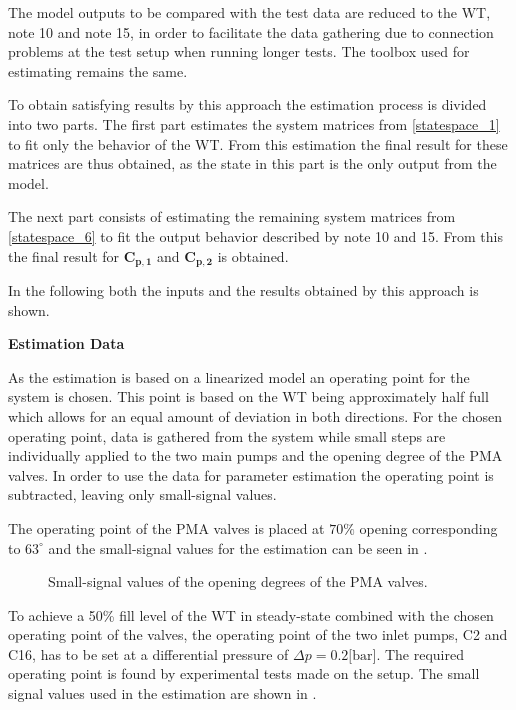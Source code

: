 The model outputs to be compared with the test data are reduced to the WT, note 10 and note 15, in order to facilitate the data gathering due to connection problems at the test setup when running longer tests. The toolbox used for estimating remains the same. 

To obtain satisfying results by this approach the estimation process is divided into two parts. 
The first part estimates the system matrices from \eqref{statespace_1} to fit only the behavior of the WT. From this estimation the final result for these matrices are thus obtained, as the state in this part is the only output from the model.

The next part consists of estimating the remaining system matrices from \eqref{statespace_6} to fit the output behavior described by note 10 and 15. From this the final result for $ \bm{C_{p,1}} $ and $ \bm{C_{p,2}}$ is obtained. 

In the following both the inputs and the results obtained by this approach is shown.

\textbf{Estimation Data}

As the estimation is based on a linearized model an operating point for the system is chosen. This point is based on the WT being approximately half full which allows for an equal amount of deviation in both directions. For the chosen operating point, data is gathered from the system while small steps are individually applied to the two main pumps and the opening degree of the PMA valves. In order to use the data for parameter estimation the operating point is subtracted, leaving only small-signal values.  

The operating point of the PMA valves is placed at $70\%$ opening corresponding to $63^{\circ}$ and the small-signal values for the estimation can be seen in .

\begin{figure}[H]
\centering
 
\caption{Small-signal values of the opening degrees of the PMA valves.}
\label{fig:est_OD_data_final}
\end{figure}

To achieve a 50\% fill level of the WT in steady-state combined with the chosen operating point of the valves, the operating point of the two inlet pumps, C2 and C16, has to be set at a differential pressure of $\Delta p = 0.2 \text{[bar]}$. The required operating point is found by experimental tests made on the setup. The small signal values used in the estimation are shown in . 

